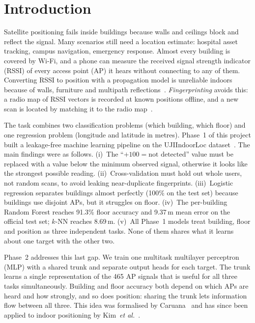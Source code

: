 \documentclass[conference]{IEEEtran}
\begin{document}
\section{Introduction}

Satellite positioning fails inside buildings because walls and ceilings block and reflect the
signal. Many scenarios still need a location estimate: hospital asset tracking, campus navigation,
emergency response. Almost every building is covered by Wi-Fi, and a phone can measure the
received signal strength indicator (RSSI) of every access point (AP) it hears without connecting
to any of them. Converting RSSI to position with a propagation model is unreliable indoors because
of walls, furniture and multipath reflections~\cite{zafari2019survey}. \emph{Fingerprinting}
avoids this: a radio map of RSSI vectors is recorded at known positions offline, and a new scan is
located by matching it to the radio map~\cite{bahl2000radar}.

The task combines two classification problems (which building, which floor) and one regression
problem (longitude and latitude in metres). Phase~1 of this project built a leakage-free
machine learning pipeline on the UJIIndoorLoc dataset~\cite{torres2014uji}. The main findings
were as follows. (i)~The ``$+100 = \text{not detected}$'' value must be replaced with a value
below the minimum observed signal, otherwise it looks like the strongest possible reading.
(ii)~Cross-validation must hold out whole users, not random scans, to avoid leaking near-duplicate
fingerprints. (iii)~Logistic regression separates buildings almost perfectly (100\% on the
test set) because buildings use disjoint APs, but it struggles on floor. (iv)~The per-building
Random Forest reaches 91.3\% floor accuracy and 9.37\,m mean error on the official test set;
$k$-NN reaches 8.69\,m. (v)~All Phase~1 models treat building, floor and position as three
independent tasks. None of them shares what it learns about one target with the other two.

Phase~2 addresses this last gap. We train one multitask multilayer perceptron (MLP) with a shared
trunk and separate output heads for each target. The trunk learns a single representation of the
465 AP signals that is useful for all three tasks simultaneously. Building and floor accuracy both
depend on which APs are heard and how strongly, and so does position: sharing the trunk lets
information flow between all three. This idea was formalised by Caruana~\cite{caruana1997mtl}
and has since been applied to indoor positioning by Kim~\emph{et al.}~\cite{kim2018scalable}.
\end{document}

